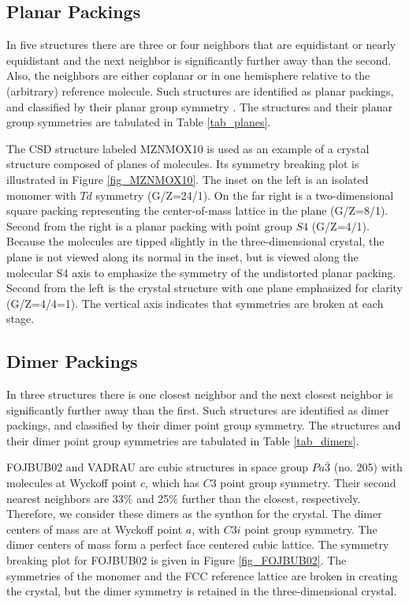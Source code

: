 \documentclass[preprint]{iucr}              %
\begin{document}
\subsection{Planar Packings}

In five structures there are three or four neighbors that are equidistant or nearly equidistant and the next neighbor is significantly further away than the second.  Also, the neighbors are either coplanar or in one hemisphere relative to the (arbitrary) reference molecule.  Such structures are identified as planar packings, and classified by their planar group symmetry \cite{Hahn02VolE}.  The structures and their planar group symmetries are tabulated in Table \ref{tab_planes}.  

The CSD structure labeled MZNMOX10 is used as an example of a crystal structure composed of planes of molecules.  Its symmetry breaking plot is illustrated in Figure \ref{fig_MZNMOX10}.  The inset on the left is an isolated monomer with $Td$ symmetry (G/Z=24/1).  On the far right is a two-dimensional square packing representing the center-of-mass lattice in the plane (G/Z=8/1).  Second from the right is a planar packing with point group $S4$ (G/Z=4/1).  Because the molecules are tipped slightly in the three-dimensional crystal, the plane is not viewed along its normal in the inset, but is viewed along the molecular S4 axis to emphasize the symmetry of the undistorted planar packing.  Second from the left is the crystal structure with one plane emphasized for clarity (G/Z=4/4=1).  The vertical axis indicates that symmetries are broken at each stage.

\subsection{Dimer Packings}

In three structures there is one closest neighbor and the next closest neighbor is significantly further away than the first.  Such structures are identified as dimer packings, and classified by their dimer point group symmetry.  The structures and their dimer point group symmetries are tabulated in Table \ref{tab_dimers}.  

FOJBUB02 and VADRAU are cubic structures in space group $Pa\bar{3}$ (no. 205) with molecules at Wyckoff point $c$, which has $C3$ point group symmetry.  Their second nearest neighbors are 33\% and 25\% further than the closest, respectively.  Therefore, we consider these dimers as the synthon for the crystal.  The dimer centers of mass are at Wyckoff point $a$, with $C3i$ point group symmetry.  The dimer centers of mass form a perfect face centered cubic lattice.  The symmetry breaking plot for FOJBUB02 is given in Figure \ref{fig_FOJBUB02}.  The symmetries of the monomer and the FCC reference lattice are broken in creating the crystal, but the dimer symmetry is retained in the three-dimensional crystal.
\end{document}
